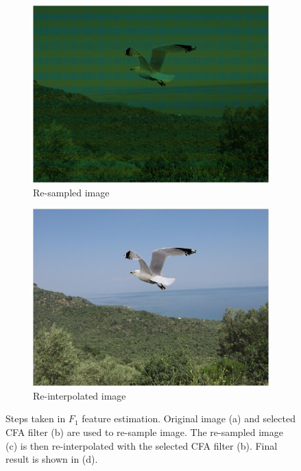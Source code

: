 \documentclass{template/acm_proc_article-sp}
\begin{document}
\begin{figure}
\begin{subfigure}{0.23\textwidth}
    \includegraphics[trim=0 0 0 0,clip,width=\linewidth]{report/results/f1_steps_2.jpg}
    \caption{Re-sampled image}
\end{subfigure}
\hspace*{\fill}
\begin{subfigure}{0.23\textwidth}
    \includegraphics[trim=0 0 0 0,clip,width=\linewidth]{report/results/f1_steps_3.jpg}
    \caption{Re-interpolated image}
\end{subfigure}

\caption{Steps taken in $F_1$ feature estimation. Original image (a) and selected CFA filter (b) are used to re-sample image. The re-sampled image (c) is then re-interpolated with the selected CFA filter (b). Final result is shown in (d).}
\label{img_f1_steps}
\end{figure}
\end{document}
